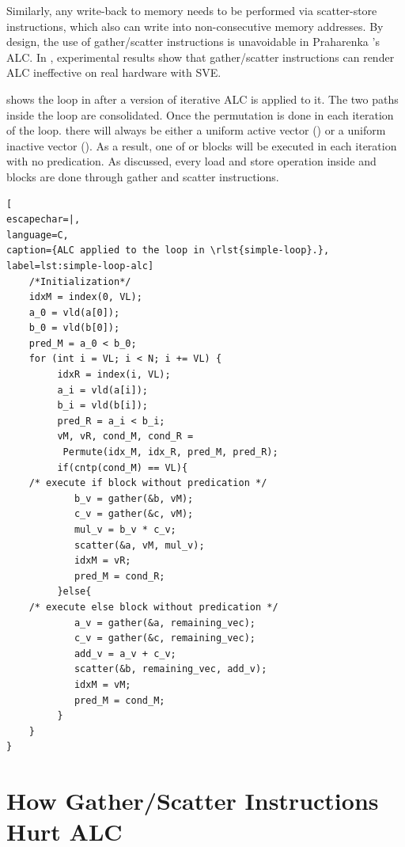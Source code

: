 Similarly, any write-back to memory needs to be performed via scatter-store instructions, which also can write into non-consecutive memory addresses.
By design, the use of gather/scatter instructions is unavoidable in Praharenka \etal's ALC. In , experimental results show that gather/scatter instructions can render ALC ineffective on real hardware with SVE.

 shows the loop in  after a version of iterative ALC is applied to it. The two paths inside the loop are consolidated. Once the permutation is done in each iteration of the loop. there will always be either a uniform active vector (\vM) or a uniform inactive vector (\vR). As a result, one of \Then or \Else blocks will be executed in each iteration with no predication. As discussed, every load and store operation inside \Then and \Else blocks are done through gather and scatter instructions.

\begin{center}
\begin{minipage}[t]{0.8\columnwidth}
\begin{lstlisting}[
escapechar=|,
language=C,
caption={ALC applied to the loop in \rlst{simple-loop}.}, label=lst:simple-loop-alc]
    /*Initialization*/
    idxM = index(0, VL);
    a_0 = vld(a[0]);
    b_0 = vld(b[0]);
    pred_M = a_0 < b_0;
    for (int i = VL; i < N; i += VL) {
         idxR = index(i, VL);
         a_i = vld(a[i]);
         b_i = vld(b[i]);
         pred_R = a_i < b_i;
         vM, vR, cond_M, cond_R =
          Permute(idx_M, idx_R, pred_M, pred_R);
         if(cntp(cond_M) == VL){
    /* execute if block without predication */
            b_v = gather(&b, vM);
            c_v = gather(&c, vM);
            mul_v = b_v * c_v;
            scatter(&a, vM, mul_v);
            idxM = vR;
            pred_M = cond_R;
         }else{
    /* execute else block without predication */
            a_v = gather(&a, remaining_vec);
            c_v = gather(&c, remaining_vec);
            add_v = a_v + c_v;
            scatter(&b, remaining_vec, add_v);
            idxM = vM;
            pred_M = cond_M;
         }
    }
}
\end{lstlisting}
\end{minipage}
\end{center}





\section{How Gather/Scatter Instructions Hurt ALC}
\label{sec:gathers-scatters-are-bad}

